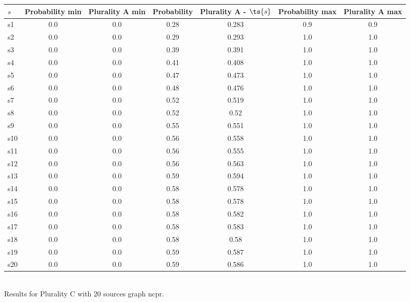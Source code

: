 \documentclass{article}
\begin{document}
\noindent\begin{tabular}{|l|c|c|c|c|c|c|}
\hline
$s$& Probability min & Plurality A min & Probability & Plurality A - $\ts{s}$ & Probability max & Plurality A max\\
\hline
s1 &0.0 & 0.0 & 0.28 & 0.283 & 0.9 & 0.9\\
\hline
s2 &0.0 & 0.0 & 0.29 & 0.293 & 1.0 & 1.0\\
\hline
s3 &0.0 & 0.0 & 0.39 & 0.391 & 1.0 & 1.0\\
\hline
s4 &0.0 & 0.0 & 0.41 & 0.408 & 1.0 & 1.0\\
\hline
s5 &0.0 & 0.0 & 0.47 & 0.473 & 1.0 & 1.0\\
\hline
s6 &0.0 & 0.0 & 0.48 & 0.476 & 1.0 & 1.0\\
\hline
s7 &0.0 & 0.0 & 0.52 & 0.519 & 1.0 & 1.0\\
\hline
s8 &0.0 & 0.0 & 0.52 & 0.52 & 1.0 & 1.0\\
\hline
s9 &0.0 & 0.0 & 0.55 & 0.551 & 1.0 & 1.0\\
\hline
s10 &0.0 & 0.0 & 0.56 & 0.558 & 1.0 & 1.0\\
\hline
s11 &0.0 & 0.0 & 0.56 & 0.555 & 1.0 & 1.0\\
\hline
s12 &0.0 & 0.0 & 0.56 & 0.563 & 1.0 & 1.0\\
\hline
s13 &0.0 & 0.0 & 0.59 & 0.594 & 1.0 & 1.0\\
\hline
s14 &0.0 & 0.0 & 0.58 & 0.578 & 1.0 & 1.0\\
\hline
s15 &0.0 & 0.0 & 0.58 & 0.578 & 1.0 & 1.0\\
\hline
s16 &0.0 & 0.0 & 0.58 & 0.582 & 1.0 & 1.0\\
\hline
s17 &0.0 & 0.0 & 0.58 & 0.583 & 1.0 & 1.0\\
\hline
s18 &0.0 & 0.0 & 0.58 & 0.58 & 1.0 & 1.0\\
\hline
s19 &0.0 & 0.0 & 0.59 & 0.587 & 1.0 & 1.0\\
\hline
s20 &0.0 & 0.0 & 0.59 & 0.586 & 1.0 & 1.0\\
\hline
\end{tabular}\\

\noindent Results for Plurality C with 20 sources graph ncpr.
\end{document}
